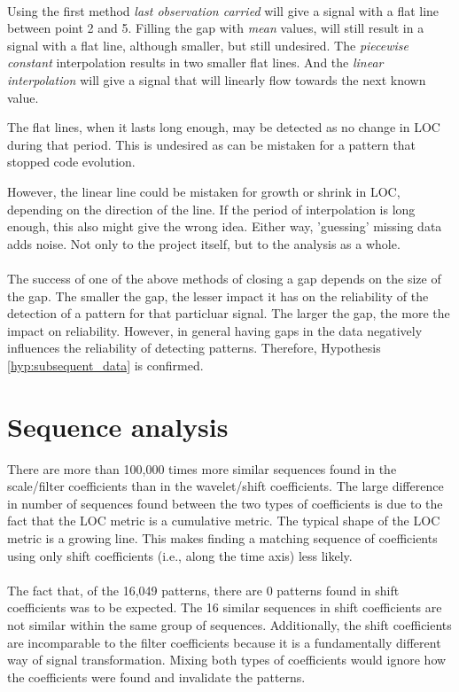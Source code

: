 \paragraph{}
Using the first method \emph{last observation carried }\rm will give a signal
with a flat line between point 2 and 5. Filling the gap with \emph{mean }\rm
values, will still result in a signal with a flat line, although smaller, but
still undesired. The \emph{piecewise constant }\rm interpolation results in two
smaller flat lines. And the \emph{linear interpolation }\rm will give a signal
that will linearly flow towards the next known value. 

The flat lines, when it lasts long enough, may be detected as no change in LOC
during that period. This is undesired as can be mistaken for a pattern that
stopped code evolution.

However, the linear line could be mistaken for growth or shrink in LOC,
depending on the direction of the line. If the period of interpolation is long
enough, this also might give the wrong idea. Either way, 'guessing' missing data
adds noise. Not only to the project itself, but to the analysis as a whole.

\paragraph{}
The success of one of the above methods of closing a gap depends on the size of
the gap. The smaller the gap, the lesser impact it has on the reliability of
the detection of a pattern for that particluar signal. The larger the gap, the
more the impact on reliability. However, in general having gaps in the data
negatively influences the reliability of detecting patterns. Therefore,
Hypothesis \ref{hyp:subsequent_data} is confirmed.

\section{Sequence analysis}
There are more than 100,000 times more similar sequences found in the
scale/filter coefficients than in the wavelet/shift coefficients. The large
difference in number of sequences found between the two types of coefficients
is due to the fact that the LOC metric is a cumulative metric. The typical shape
of the LOC metric is a growing line. This makes finding a matching sequence of
coefficients using only shift coefficients (i.e., along the time axis) less
likely.

\paragraph{}
The fact that, of the 16,049 patterns, there are 0 patterns found in shift
coefficients was to be expected. The 16 similar sequences in shift coefficients
are not similar within the same group of sequences. Additionally, the shift
coefficients are incomparable to the filter coefficients because it is a
fundamentally different way of signal transformation. Mixing both types of
coefficients would ignore how the coefficients were found and invalidate the
patterns.

